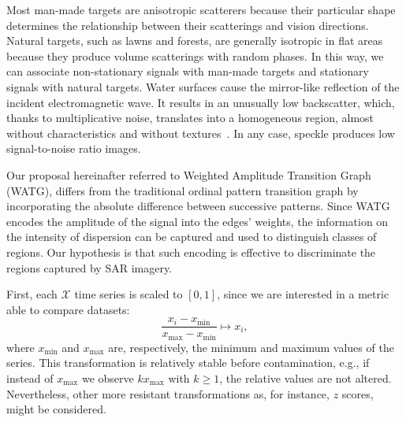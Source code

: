 \documentclass[journal]{IEEEtran}
\begin{document}

Most man-made targets are anisotropic scatterers because their particular shape determines the relationship between their scatterings and vision directions.
Natural targets, such as lawns and forests, are generally isotropic in flat areas because they produce volume scatterings with random phases. 
In this way, we can associate non-stationary signals with man-made targets and stationary signals with natural targets.  
Water surfaces cause the mirror-like reflection of the incident electromagnetic wave. 
It results in an unusually low backscatter, which, thanks to multiplicative noise, translates into a homogeneous region, almost without characteristics and without textures~\cite{wu2013man}.
In any case, speckle produces low signal-to-noise ratio images.

Our proposal hereinafter referred to  Weighted Amplitude Transition Graph (WATG), differs from the traditional ordinal pattern transition graph by incorporating the absolute difference between successive patterns. 
Since WATG encodes the amplitude of the signal into the edges' weights, the information on the intensity of dispersion can be captured and used to distinguish classes of regions. 
Our hypothesis is that such encoding is effective to discriminate the regions captured by SAR imagery.


First, each $\mathcal{X}$ time series is scaled to $[0, 1]$, since we are interested in a metric able to compare datasets:
\begin{equation}
\frac{x_i - x_{\min}}{x_{\max} - x_{\min}} \longmapsto x_i,
\label{eq:scaling}
\end{equation}
where $x_{\min}$ and $x_{\max}$ are, respectively, the minimum and maximum values of the series.
This transformation is relatively stable before contamination, e.g., if instead of $x_{\max}$ we observe $k x_{\max}$ with $k\geq 1$, the relative values are not altered. Nevertheless, other more resistant transformations as, for instance, $z$ scores, might be considered.
\end{document}
